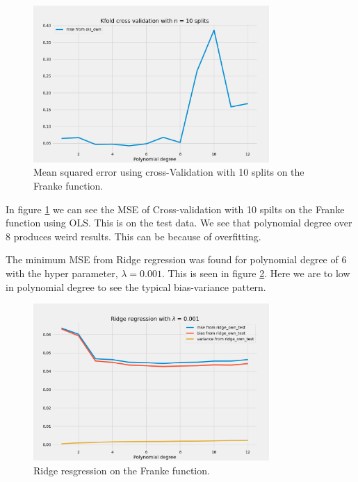 


\begin{figure}[H]
    \centering
    \includegraphics[width=0.8\textwidth]{Figures/d_kfold_ols_n_10.png}
    \caption{Mean squared error using cross-Validation with 10 splits on the Franke function.}
    \label{fig:kfold_ols_franke}
\end{figure}

In figure \ref{fig:kfold_ols_franke} we can see the MSE of Cross-validation with 10 spilts on the Franke function using OLS. This is on the test data. We see that polynomial degree over 8 produces weird results. This can be because of overfitting. 


The minimum MSE from Ridge regression was found for polynomial degree of 6 with
the hyper parameter, $\lambda = 0.001$. This is seen in figure \ref{fig:ridge_blabla}. Here we are to low in polynomial degree to see the typical bias-variance pattern.

\begin{figure}[H]
    \centering
    \caption{Ridge resgression on the Franke function.}
    \label{fig:ridge_blabla}
    \includegraphics[width=0.8\textwidth]{Figures/e_ridge_bias_variance_lamb_0_001.png}
\end{figure}


